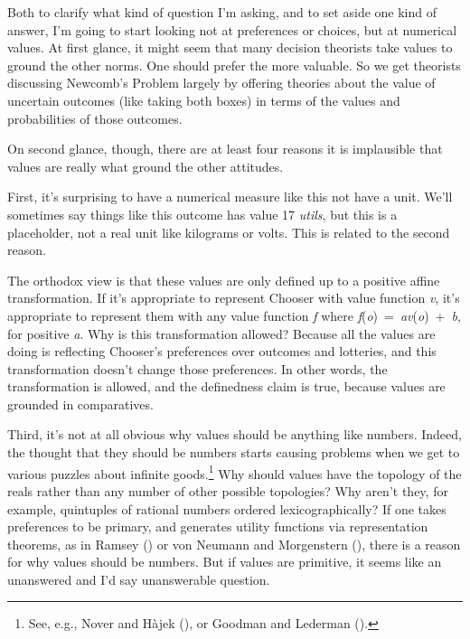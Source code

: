 \documentclass[
  10.5pt,
  twoside]{article}
\begin{document}
Both to clarify what kind of question I'm asking, and to set aside one
kind of answer, I'm going to start looking not at preferences or
choices, but at numerical values. At first glance, it might seem that
many decision theorists take values to ground the other norms. One
should prefer the more valuable. So we get theorists discussing
Newcomb's Problem largely by offering theories about the value of
uncertain outcomes (like taking both boxes) in terms of the values and
probabilities of those outcomes.

On second glance, though, there are at least four reasons it is
implausible that values are really what ground the other attitudes.

First, it's surprising to have a numerical measure like this not have a
unit. We'll sometimes say things like this outcome has value 17
\emph{utils}, but this is a placeholder, not a real unit like kilograms
or volts. This is related to the second reason.

The orthodox view is that these values are only defined up to a positive
affine transformation. If it's appropriate to represent Chooser with
value function \emph{v}, it's appropriate to represent them with any
value function \emph{f} where
\emph{f}(\emph{o})~=~\emph{av}(\emph{o})~+~\emph{b}, for positive
\emph{a}. Why is this transformation allowed? Because all the values are
doing is reflecting Chooser's preferences over outcomes and lotteries,
and this transformation doesn't change those preferences. In other
words, the transformation is allowed, and the definedness claim is true,
because values are grounded in comparatives.

Third, it's not at all obvious why values should be anything like
numbers. Indeed, the thought that they should be numbers starts causing
problems when we get to various puzzles about infinite goods.\footnote{See,
  e.g., Nover and Hàjek (), or Goodman and
  Lederman ().} Why should
values have the topology of the reals rather than any number of other
possible topologies? Why aren't they, for example, quintuples of
rational numbers ordered lexicographically? If one takes preferences to
be primary, and generates utility functions via representation theorems,
as in Ramsey () or von Neumann and
Morgenstern (), there is a reason for
why values should be numbers. But if values are primitive, it seems like
an unanswered and I'd say unanswerable question.
\end{document}
